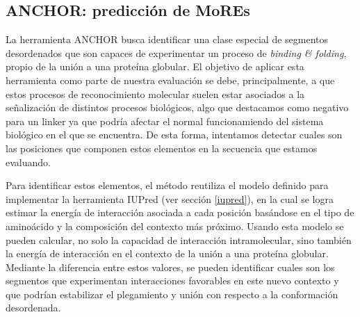 \subsection{ANCHOR: predicción de MoREs} \label{anchor}

La herramienta ANCHOR\cite{meszaros2009prediction} busca identificar una clase especial de segmentos desordenados que son capaces de experimentar un proceso de \textit{binding \& folding}, 
propio de la unión a una proteína globular. El objetivo de aplicar esta herramienta como parte de nuestra evaluación se debe, principalmente, a que estos procesos de reconocimiento molecular 
suelen estar asociados a la señalización de distintos procesos biológicos, algo que destacamos como negativo para un linker ya que podría afectar el normal funcionamiendo del sistema biológico en el que se encuentra. 
De esta forma, intentamos detectar cuales son las posiciones que componen estos elementos en la secuencia que estamos evaluando.


Para identificar estos elementos, el método reutiliza el modelo definido para implementar la herramienta IUPred (ver sección \ref{iupred}), en la cual se logra estimar la energía de interacción asociada a cada posición basándose en 
el tipo de aminoácido y la composición del contexto más próximo. Usando esta modelo se pueden calcular, no solo la capacidad de interacción intramolecular, 
sino también la energía de interacción en el contexto de la unión a una proteína globular.
Mediante la diferencia entre estos valores, se pueden identificar cuales son los segmentos que experimentan interacciones favorables en este nuevo contexto y que podrían estabilizar el plegamiento y unión con respecto a la conformación desordenada. 

